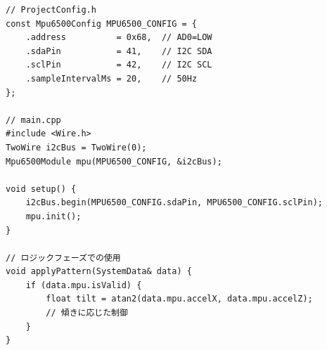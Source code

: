 \begin{lstlisting}[style=cppstyle, caption={Mpu6500Moduleの使用例}]
// ProjectConfig.h
const Mpu6500Config MPU6500_CONFIG = {
    .address          = 0x68,  // AD0=LOW
    .sdaPin           = 41,    // I2C SDA
    .sclPin           = 42,    // I2C SCL
    .sampleIntervalMs = 20,    // 50Hz
};

// main.cpp
#include <Wire.h>
TwoWire i2cBus = TwoWire(0);
Mpu6500Module mpu(MPU6500_CONFIG, &i2cBus);

void setup() {
    i2cBus.begin(MPU6500_CONFIG.sdaPin, MPU6500_CONFIG.sclPin);
    mpu.init();
}

// ロジックフェーズでの使用
void applyPattern(SystemData& data) {
    if (data.mpu.isValid) {
        float tilt = atan2(data.mpu.accelX, data.mpu.accelZ);
        // 傾きに応じた制御
    }
}
\end{lstlisting}
